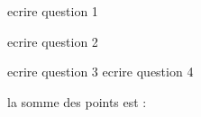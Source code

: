 \documentclass[addpoints]{exam}
\begin{document}
\begin{questions}
\question[2] ecrire question 1\totalpoints


\question[5] ecrire question 2\totalpoints

\question[1] ecrire question 3
\question[4] ecrire question 4



la somme des points est : \numpoints

\end{questions}
\end{document}
